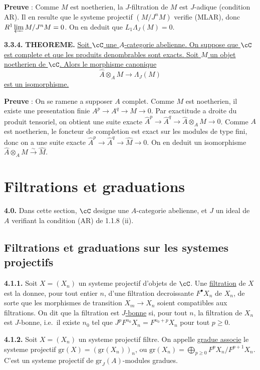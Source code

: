 \textbf{Preuve} : Comme $M$ est noetherien, la $J$-filtration de $M$ est $J$-adique (condition AR). Il en resulte que le systeme projectif $(M/J^n M)$ verifie (MLAR), donc $R^1 \varprojlim M/J^n M = 0$. On en deduit que $L_1 \Lambda_J(M) = 0$.

\medskip
\noindent\textbf{3.3.4.} \textbf{THEOREME.} \underline{Soit $\cC$ une $A$-categorie abelienne. On suppose que $\cC$ est complete et que les produits denombrables sont exacts. Soit $M$ un objet noetherien de $\cC$. Alors le morphisme canonique}
\[
\hat{A} \otimes_A M \longrightarrow \Lambda_J(M)
\]
\underline{est un isomorphisme.}

\textbf{Preuve} : On se ramene a supposer $A$ complet. Comme $M$ est noetherien, il existe une presentation finie $A^p \longrightarrow A^q \longrightarrow M \longrightarrow 0$. Par exactitude a droite du produit tensoriel, on obtient une suite exacte $\hat{A}^p \longrightarrow \hat{A}^q \longrightarrow \hat{A} \otimes_A M \longrightarrow 0$. Comme $A$ est noetherien, le foncteur de completion est exact sur les modules de type fini, donc on a une suite exacte $\hat{A}^p \longrightarrow \hat{A}^q \longrightarrow \hat{M} \longrightarrow 0$. On en deduit un isomorphisme $\hat{A} \otimes_A M \xrightarrow{\sim} \hat{M}$.

\section{Filtrations et graduations}

\medskip
\noindent\textbf{4.0.} Dans cette section, $\cC$ designe une $A$-categorie abelienne, et $J$ un ideal de $A$ verifiant la condition (AR) de 1.1.8 (ii).

\subsection{Filtrations et graduations sur les systemes projectifs}

\medskip
\noindent\textbf{4.1.1.} Soit $X = (X_n)$ un systeme projectif d'objets de $\cC$. Une \underline{filtration} de $X$ est la donnee, pour tout entier $n$, d'une filtration decroissante $F^\bullet X_n$ de $X_n$, de sorte que les morphismes de transition $X_m \longrightarrow X_n$ soient compatibles aux filtrations. On dit que la filtration est \underline{$J$-bonne} si, pour tout $n$, la filtration de $X_n$ est $J$-bonne, i.e.\ il existe $n_0$ tel que $J^p F^{n_0} X_n = F^{n_0+p} X_n$ pour tout $p \geq 0$.

\medskip
\noindent\textbf{4.1.2.} Soit $X = (X_n)$ un systeme projectif filtre. On appelle \underline{gradue associe} le systeme projectif $\mathrm{gr}(X) = (\mathrm{gr}(X_n))_n$, ou $\mathrm{gr}(X_n) = \bigoplus_{p \geq 0} F^p X_n / F^{p+1} X_n$. C'est un systeme projectif de $\mathrm{gr}_J(A)$-modules gradues.

